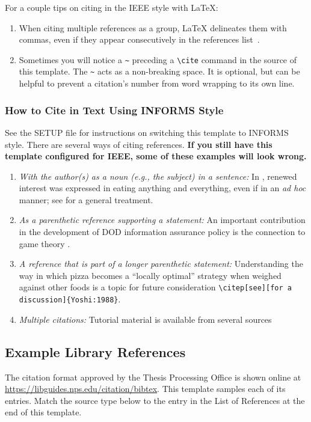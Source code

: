 For a couple tips on citing in the IEEE style with \LaTeX{}:
\begin{enumerate}
    \item When citing multiple references as a group, \LaTeX{} delineates them with commas, even if they appear consecutively in the references list~\cite{pollan_2006,Crabtree:Chaplin:2013,DOD.8570.01-M}.
    \item Sometimes you will notice a \verb|~| preceding a \verb|\cite| command in the source of this template.  The \verb|~| acts as a non-breaking space.  It is optional, but can be helpful to prevent a citation's number from word wrapping to its own line.
\end{enumerate}

\subsubsection{How to Cite in Text Using INFORMS Style}
See the SETUP file for instructions on switching this template to INFORMS style. There are several ways of citing references. \textbf{If you still have this template configured for IEEE, some of these examples will look wrong.}
\begin{enumerate}
    \item {\it With the author(s) as a noun (e.g., the subject) in a sentence:}
    In \citet{pollan_2006}, renewed interest was expressed in eating anything and everything, even if in an {\it ad hoc} manner; see \citet{Crabtree:Chaplin:2013} for a general treatment.  
    \item {\it As a parenthetic reference supporting a statement:} 
    An important contribution in the development of DOD information assurance policy is the connection to game theory \citep{DOD.8570.01-M}. 
    \item {\it A reference that is part of a longer parenthetic statement:} 
    Understanding the way in which pizza becomes a ``locally optimal'' strategy when weighed against other foods is a topic for future consideration \ifinforms\citep[see][for a discussion]{Yoshi:1988}\else\verb|\citep[see][for a discussion]{Yoshi:1988}|\fi.
    \item {\it Multiple citations:} 
    Tutorial material is available from several sources \citep{Monster:1985, Nekeip:2008, pollan_2006}
\end{enumerate}

\subsection{Example Library References}
The citation format approved by the Thesis Processing Office is shown online at \url{https://libguides.nps.edu/citation/bibtex}. This template samples each of its entries. Match the source type below to the entry in the List of References at the end of this template.

